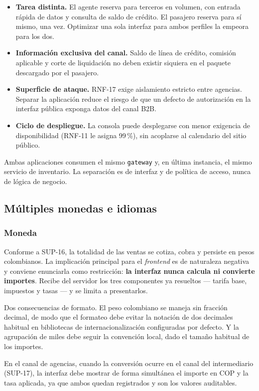 \documentclass[10pt,letterpaper]{article}
\begin{document}
\begin{itemize}
  \item \textbf{Tarea distinta.} El agente reserva para terceros en volumen, con entrada rápida de datos y consulta de saldo de crédito. El pasajero reserva para sí mismo, una vez. Optimizar una sola interfaz para ambos perfiles la empeora para los dos.
  \item \textbf{Información exclusiva del canal.} Saldo de línea de crédito, comisión aplicable y corte de liquidación no deben existir siquiera en el paquete descargado por el pasajero.
  \item \textbf{Superficie de ataque.} RNF-17 exige aislamiento estricto entre agencias. Separar la aplicación reduce el riesgo de que un defecto de autorización en la interfaz pública exponga datos del canal B2B.
  \item \textbf{Ciclo de despliegue.} La consola puede desplegarse con menor exigencia de disponibilidad (RNF-11 le asigna 99\,\%), sin acoplarse al calendario del sitio público.
\end{itemize}

Ambas aplicaciones consumen el mismo \texttt{gateway} y, en última instancia, el mismo servicio de inventario. La separación es de interfaz y de política de acceso, nunca de lógica de negocio.

\subsection{Múltiples monedas e idiomas}

\subsubsection{Moneda}
Conforme a SUP-16, la totalidad de las ventas se cotiza, cobra y persiste en pesos colombianos. La implicación principal para el \emph{frontend} es de naturaleza negativa y conviene enunciarla como restricción: \textbf{la interfaz nunca calcula ni convierte importes}. Recibe del servidor los tres componentes ya resueltos --- tarifa base, impuestos y tasas --- y se limita a presentarlos.

Dos consecuencias de formato. El peso colombiano se maneja sin fracción decimal, de modo que el formateo debe evitar la notación de dos decimales habitual en bibliotecas de internacionalización configuradas por defecto. Y la agrupación de miles debe seguir la convención local, dado el tamaño habitual de los importes.

En el canal de agencias, cuando la conversión ocurre en el canal del intermediario (SUP-17), la interfaz debe mostrar de forma simultánea el importe en COP y la tasa aplicada, ya que ambos quedan registrados y son los valores auditables.
\end{document}
